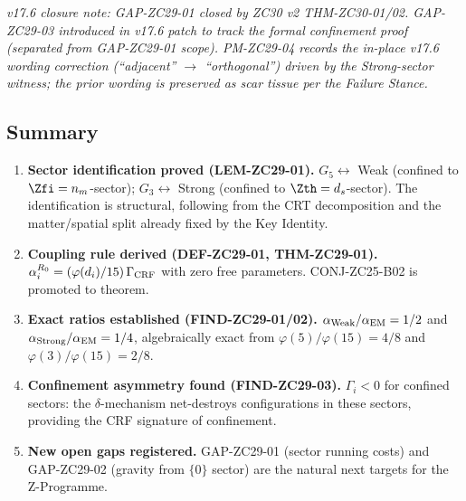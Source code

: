 \documentclass[12pt, a4paper]{article}
\begin{document}
\vspace{-6pt}

\textit{v17.6 closure note: GAP-ZC29-01 closed by ZC30 v2
THM-ZC30-01/02. GAP-ZC29-03 introduced in v17.6 patch to
track the formal confinement proof (separated from
GAP-ZC29-01 scope). PM-ZC29-04 records the in-place v17.6
wording correction (``adjacent'' $\to$ ``orthogonal'')
driven by the Strong-sector witness; the prior wording is
preserved as scar tissue per the Failure Stance.}

\subsection{Summary}
\label{zc29:sec:summary}

\begin{enumerate}[leftmargin=*, label=\arabic*., noitemsep]

\item \textbf{Sector identification proved (LEM-ZC29-01).}
$G_5 \leftrightarrow$ Weak (confined to $\Zfi = n_m$-sector);
$G_3 \leftrightarrow$ Strong (confined to $\Zth = d_s$-sector).
The identification is structural, following from the CRT
decomposition and the matter/spatial split already fixed by
the Key Identity.

\item \textbf{Coupling rule derived (DEF-ZC29-01, THM-ZC29-01).}
$\alpha_i^{R_0} = (\varphi(d_i)/15)\,\Gamma_{\rm CRF}$ with zero
free parameters. CONJ-ZC25-B02 is promoted to theorem.

\item \textbf{Exact ratios established (FIND-ZC29-01/02).}
$\alpha_{\rm Weak}/\alpha_{\rm EM} = 1/2$ and
$\alpha_{\rm Strong}/\alpha_{\rm EM} = 1/4$, algebraically exact
from $\varphi(5)/\varphi(15) = 4/8$ and $\varphi(3)/\varphi(15) = 2/8$.

\item \textbf{Confinement asymmetry found (FIND-ZC29-03).}
$\Gamma_i < 0$ for confined sectors: the $\delta$-mechanism
net-destroys configurations in these sectors, providing the
CRF signature of confinement.

\item \textbf{New open gaps registered.}
GAP-ZC29-01 (sector running costs) and GAP-ZC29-02 (gravity
from $\{0\}$ sector) are the natural next targets for the
Z-Programme.

\end{enumerate}
\end{document}

